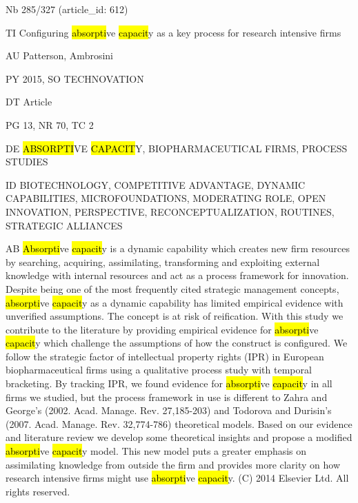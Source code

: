 \documentclass[a4paper]{article}
\begin{document}
\vspace*{-2cm}
Nb \tabto{0cm}285/327 (article\_id: 612)\par
TI \tabto{0cm}Configuring \hl{absorpti}ve \hl{capacit}y as a key process for research intensive firms\par
AU \tabto{0cm}Patterson, Ambrosini\par
PY \tabto{0cm}2015, SO TECHNOVATION\par
DT \tabto{0cm}Article\par
PG \tabto{0cm}13, NR 70, TC 2\par
DE \tabto{0cm}\hl{ABSORPTI}VE \hl{CAPACIT}Y, BIOPHARMACEUTICAL FIRMS, PROCESS STUDIES\par
ID \tabto{0cm}BIOTECHNOLOGY, COMPETITIVE ADVANTAGE, DYNAMIC CAPABILITIES, MICROFOUNDATIONS, MODERATING ROLE, OPEN INNOVATION, PERSPECTIVE, RECONCEPTUALIZATION, ROUTINES, STRATEGIC ALLIANCES\par
AB \tabto{0cm}\hl{Absorpti}ve \hl{capacit}y is a dynamic capability which creates new firm resources by searching, acquiring, assimilating, transforming and exploiting external knowledge with internal resources and act as a process framework for innovation. Despite being one of the most frequently cited strategic management concepts, \hl{absorpti}ve \hl{capacit}y as a dynamic capability has limited empirical evidence with unverified assumptions. The concept is at risk of reification. With this study we contribute to the literature by providing empirical evidence for \hl{absorpti}ve \hl{capacit}y which challenge the assumptions of how the construct is configured. We follow the strategic factor of intellectual property rights (IPR) in European biopharmaceutical firms using a qualitative process study with temporal bracketing. By tracking IPR, we found evidence for \hl{absorpti}ve \hl{capacit}y in all firms we studied, but the process framework in use is different to Zahra and George's (2002. Acad. Manage. Rev. 27,185-203) and Todorova and Durisin's (2007. Acad. Manage. Rev. 32,774-786) theoretical models. Based on our evidence and literature review we develop some theoretical insights and propose a modified \hl{absorpti}ve \hl{capacit}y model. This new model puts a greater emphasis on assimilating knowledge from outside the firm and provides more clarity on how research intensive firms might use \hl{absorpti}ve \hl{capacit}y. (C) 2014 Elsevier Ltd. All rights reserved.\par
\clearpage
\end{document}
